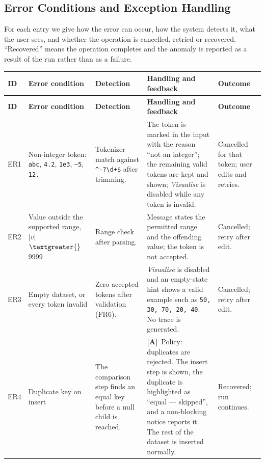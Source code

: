 \documentclass[11pt,a4paper]{article}
\newcommand{\A}{\textcolor{asmc}{\textbf{[A]}}}     %
\newcommand{\ct}[1]{\texttt{#1}}
\newcommand{\gt}{\textgreater{}}
\newcommand{\norm}[1]{\ensuremath{\lvert #1 \rvert}}
\begin{document}
\subsection{Error Conditions and Exception Handling}

For each entry we give how the error can occur, how the system detects it, what the user
sees, and whether the operation is cancelled, retried or recovered. ``Recovered'' means
the operation completes and the anomaly is reported as a result of the run rather than as
a failure.

{\footnotesize
\setlength{\tabcolsep}{3pt}
\begin{longtable}{@{}L{0.9cm}L{3.3cm}L{3.0cm}L{5.9cm}L{2.0cm}@{}}
\toprule
\textbf{ID} & \textbf{Error condition} & \textbf{Detection} & \textbf{Handling and feedback} &
\textbf{Outcome} \\
\midrule
\endfirsthead
\toprule
\textbf{ID} & \textbf{Error condition} & \textbf{Detection} & \textbf{Handling and feedback} &
\textbf{Outcome} \\
\midrule
\endhead
\bottomrule
\endlastfoot

ER1 & Non-integer token: \ct{abc}, \ct{4.2}, \ct{1e3}, \ct{--5}, \ct{12.} &
Tokenizer match against \ct{\^{}-?\textbackslash d+\$} after trimming. &
The token is marked in the input with the reason ``not an integer''; the remaining valid
tokens are kept and shown; \emph{Visualise} is disabled while any token is invalid. &
Cancelled for that token; user edits and retries. \\

ER2 & Value outside the supported range, \norm{v} $\gt$ 9999 &
Range check after parsing. &
Message states the permitted range and the offending value; the token is not accepted. &
Cancelled; retry after edit. \\

ER3 & Empty dataset, or every token invalid &
Zero accepted tokens after validation (FR6). &
\emph{Visualise} is disabled and an empty-state hint shows a valid example such as
\ct{50, 30, 70, 20, 40}. No trace is generated. &
Cancelled; retry after edit. \\

ER4 & Duplicate key on insert &
The comparison step finds an equal key before a null child is reached. &
\A\ Policy: duplicates are rejected. The insert step is shown, the duplicate is highlighted
as ``equal --- skipped'', and a non-blocking notice reports it. The rest of the dataset is
inserted normally. &
Recovered; run continues. \\


\end{longtable}}
\end{document}

